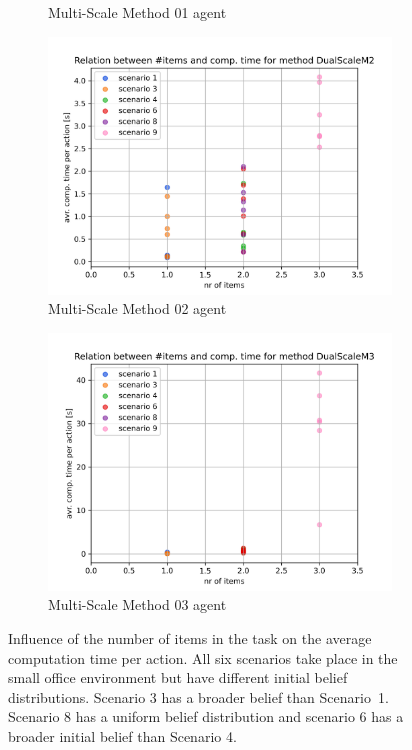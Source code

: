\begin{figure}[h]
\begin{subfigure}[b]{0.49\textwidth}
        \caption{Multi-Scale Method 01 agent}
        \label{subfig:nr_of_items_D1}
    \end{subfigure}
    \hfill
    \begin{subfigure}[b]{0.49\textwidth}
        \includegraphics[width=\textwidth]{Report/images/nr_of_items/items_vs_comptime_DualScaleM2.png}
        \caption{Multi-Scale Method 02 agent}
        \label{subfig:nr_of_items_D2}
    \end{subfigure}
    \hfill
    \begin{subfigure}[b]{0.49\textwidth}
         \includegraphics[width=\textwidth]{Report/images/nr_of_items/items_vs_comptime_DualScaleM3.png}
        \caption{Multi-Scale Method 03 agent}
        \label{subfig:nr_of_items_D3}
    \end{subfigure}
     \caption{Influence of the number of items in the task on the average computation time per action. All six scenarios take place in the small office environment but have different initial belief distributions. Scenario 3 has a broader belief than Scenario~1. Scenario 8 has a uniform belief distribution and scenario 6 has a broader initial belief than Scenario 4.}
    \label{fig:nr_of_items}
\end{figure}
